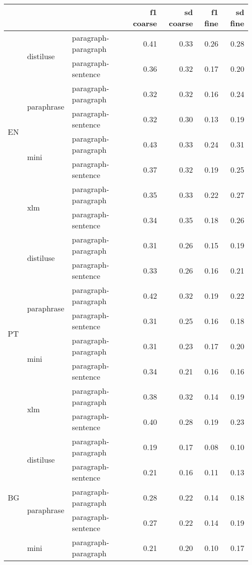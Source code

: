 \begin{tabular}{lllrrrr}
\toprule
 &  &  & f1 coarse & sd coarse & f1 fine & sd fine \\
\midrule
\multirow[t]{8}{*}{EN} & \multirow[t]{2}{*}{distiluse} & paragraph-paragraph & 0.41 & 0.33 & 0.26 & 0.28 \\
 &  & paragraph-sentence & 0.36 & 0.32 & 0.17 & 0.20 \\
\cline{2-7}
 & \multirow[t]{2}{*}{paraphrase} & paragraph-paragraph & 0.32 & 0.32 & 0.16 & 0.24 \\
 &  & paragraph-sentence & 0.32 & 0.30 & 0.13 & 0.19 \\
\cline{2-7}
 & \multirow[t]{2}{*}{mini} & paragraph-paragraph & 0.43 & 0.33 & 0.24 & 0.31 \\
 &  & paragraph-sentence & 0.37 & 0.32 & 0.19 & 0.25 \\
\cline{2-7}
 & \multirow[t]{2}{*}{xlm} & paragraph-paragraph & 0.35 & 0.33 & 0.22 & 0.27 \\
 &  & paragraph-sentence & 0.34 & 0.35 & 0.18 & 0.26 \\
\cline{1-7} \cline{2-7}
\multirow[t]{8}{*}{PT} & \multirow[t]{2}{*}{distiluse} & paragraph-paragraph & 0.31 & 0.26 & 0.15 & 0.19 \\
 &  & paragraph-sentence & 0.33 & 0.26 & 0.16 & 0.21 \\
\cline{2-7}
 & \multirow[t]{2}{*}{paraphrase} & paragraph-paragraph & 0.42 & 0.32 & 0.19 & 0.22 \\
 &  & paragraph-sentence & 0.31 & 0.25 & 0.16 & 0.18 \\
\cline{2-7}
 & \multirow[t]{2}{*}{mini} & paragraph-paragraph & 0.31 & 0.23 & 0.17 & 0.20 \\
 &  & paragraph-sentence & 0.34 & 0.21 & 0.16 & 0.16 \\
\cline{2-7}
 & \multirow[t]{2}{*}{xlm} & paragraph-paragraph & 0.38 & 0.32 & 0.14 & 0.19 \\
 &  & paragraph-sentence & 0.40 & 0.28 & 0.19 & 0.23 \\
\cline{1-7} \cline{2-7}
\multirow[t]{8}{*}{BG} & \multirow[t]{2}{*}{distiluse} & paragraph-paragraph & 0.19 & 0.17 & 0.08 & 0.10 \\
 &  & paragraph-sentence & 0.21 & 0.16 & 0.11 & 0.13 \\
\cline{2-7}
 & \multirow[t]{2}{*}{paraphrase} & paragraph-paragraph & 0.28 & 0.22 & 0.14 & 0.18 \\
 &  & paragraph-sentence & 0.27 & 0.22 & 0.14 & 0.19 \\
\cline{2-7}
 & \multirow[t]{2}{*}{mini} & paragraph-paragraph & 0.21 & 0.20 & 0.10 & 0.17 \\

\end{tabular}

